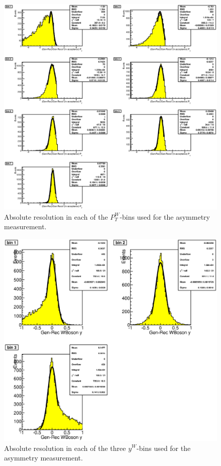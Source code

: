 \documentclass[12pt]{article}
\begin{document}
\begin{figure}[htbp]
\begin{center}
\includegraphics[scale=0.6]{images/resolution/hWp_ResolutionPt}
\end{center}
\caption{Absolute resolution in each of the $P_{T}^{W}$-bins used for the asymmetry measurement.}
\label{fig:reso-pt} 
\end{figure}


\begin{figure}[htbp]
\begin{center}
\includegraphics[scale=0.55]{images/resolution/hWp_AbsoResolutionRap}
\end{center}
\caption{Absolute resolution in each of the three $y^{W}$-bins used for the asymmetry measurement.}
\label{fig:reso-y} 
\end{figure}
\end{document}
